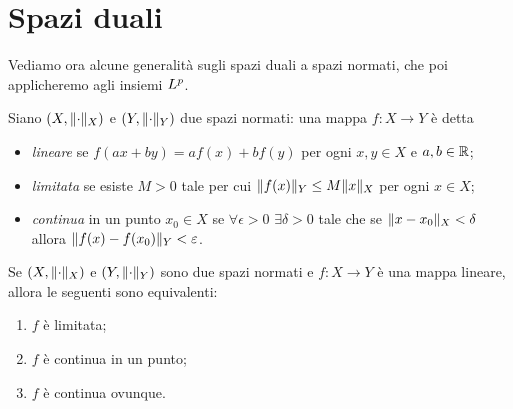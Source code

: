 \section{Spazi duali}
Vediamo ora alcune generalità sugli spazi duali a spazi normati, che poi applicheremo agli insiemi $\lclass[p]$.
\begin{definizione} \label{d:mappa-lineare-continua-limitata}
    Siano $(X,\norm{\cdot}_X)$ e $(Y,\norm{\cdot}_Y)$ due spazi normati: una mappa $f\colon X\to Y$ è detta
    \begin{itemize}
        \item \emph{lineare} se $f(ax+by)=af(x)+bf(y)$ per ogni $x,y\in X$ e $a,b\in\R$;
        \item \emph{limitata} se esiste $M>0$ tale per cui $\norm{f(x)}_Y\le M\norm{x}_X$ per ogni $x\in X$;
        \item \emph{continua} in un punto $x_0\in X$ se $\forall\epsilon>0$ $\exists\delta>0$ tale che se $\norm{x-x_0}_X<\delta$ allora $\norm{f(x)-f(x_0)}_Y<\epsilon$.
    \end{itemize}
\end{definizione}
\begin{teorema} \label{t:continuita-limitatezza-linearita}
    Se $(X,\norm{\cdot}_X)$ e $(Y,\norm{\cdot}_Y)$ sono due spazi normati e $f\colon X\to Y$ è una mappa lineare, allora le seguenti sono equivalenti:
    \begin{enumerate}
        \item $f$ è limitata;
        \item $f$ è continua in un punto;
        \item $f$ è continua ovunque.
    \end{enumerate}
\end{teorema}
